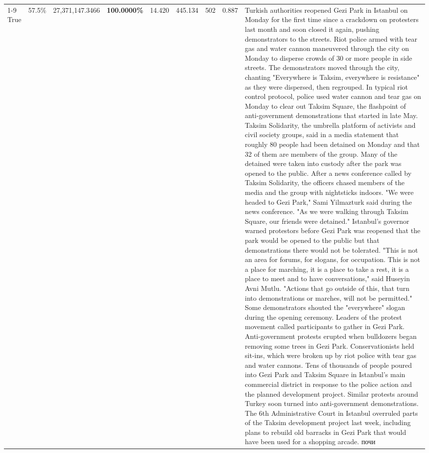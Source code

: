 \begin{table}[H]
\begin{tabular}{lllrlllll}
\cline{1-9}
True & 57.5\% & 27,371,147.3466 & \bfseries \color{red} 100.0000\% & 14.420 & 445.134 & 502 & 0.887 & Turkish authorities reopened Gezi Park in Istanbul on Monday for the first time since a crackdown on protesters last month and soon closed it again, pushing demonstrators to the streets. Riot police armed with tear gas and water cannon maneuvered through the city on Monday to disperse crowds of 30 or more people in side streets. The demonstrators moved through the city, chanting "Everywhere is Taksim, everywhere is resistance" as they were dispersed, then regrouped. In typical riot control protocol, police used water cannon and tear gas on Monday to clear out Taksim Square, the flashpoint of anti-government demonstrations that started in late May. Taksim Solidarity, the umbrella platform of activists and civil society groups, said in a media statement that roughly 80 people had been detained on Monday and that 32 of them are members of the group. Many of the detained were taken into custody after the park was opened to the public. After a news conference called by Taksim Solidarity, the officers chased members of the media and the group with nightsticks indoors. "We were headed to Gezi Park," Sami Yilmazturk said during the news conference. "As we were walking through Taksim Square, our friends were detained." Istanbul's governor warned protestors before Gezi Park was reopened that the park would be opened to the public but that demonstrations there would not be tolerated. "This is not an area for forums, for slogans, for occupation. This is not a place for marching, it is a place to take a rest, it is a place to meet and to have conversations," said Huseyin Avni Mutlu. "Actions that go outside of this, that turn into demonstrations or marches, will not be permitted." Some demonstrators shouted the "everywhere" slogan during the opening ceremony. Leaders of the protest movement called participants to gather in Gezi Park. Anti-government protests erupted when bulldozers began removing some trees in Gezi Park. Conservationists held sit-ins, which were broken up by riot police with tear gas and water cannons. Tens of thousands of people poured into Gezi Park and Taksim Square in Istanbul's main commercial district in response to the police action and the planned development project. Similar protests around Turkey soon turned into anti-government demonstrations. The 6th Administrative Court in Istanbul overruled parts of the Taksim development project last week, including plans to rebuild old barracks in Gezi Park that would have been used for a shopping arcade. почи \\

\end{tabular}
\end{table}
